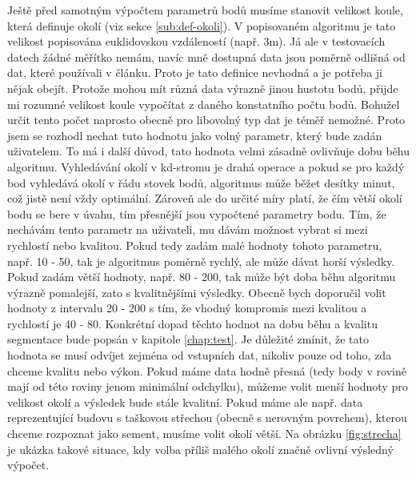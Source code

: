 \documentclass[11pt,twoside,a4paper]{book}
\begin{document}
Ještě před samotným výpočtem parametrů bodů musíme stanovit velikost koule, která definuje okolí (viz sekce \ref{sub:def-okoli}). V popisovaném algoritmu je tato velikost popisována euklidovskou vzdáleností (např. 3m). Já ale v testovacích datech žádné měřítko nemám, navíc mně dostupná data jsou poměrně odlišná od dat, které používali v článku. Proto je tato definice nevhodná a je potřeba ji nějak obejít. Protože mohou mít různá data výrazně jinou hustotu bodů, přijde mi rozumné velikost koule vypočítat z daného konstatního počtu bodů. Bohužel určit tento počet naprosto obecně pro libovolný typ dat je téměř nemožné. Proto jsem se rozhodl nechat tuto hodnotu jako volný parametr, který bude zadán uživatelem. To má i další důvod, tato hodnota velmi zásadně ovlivňuje dobu běhu algoritmu. Vyhledávání okolí v kd-stromu je drahá operace a pokud se pro každý bod vyhledává okolí v řádu stovek bodů, algoritmus může běžet desítky minut, což jistě není vždy optimální. Zároveň ale do určité míry platí, že čím větší okolí bodu se bere v úvahu, tím přesnější jsou vypočtené parametry bodu. Tím, že nechávám tento parametr na uživateli, mu dávám možnost vybrat si mezi rychlostí nebo kvalitou. Pokud tedy zadám malé hodnoty tohoto parametru, např. 10 - 50, tak je algoritmus poměrně rychlý, ale může dávat horší výsledky. Pokud zadám větší hodnoty, např. 80 - 200, tak může být doba běhu algoritmu výrazně pomalejší, zato s kvalitnějšími výsledky. Obecně bych doporučil volit hodnoty z intervalu 20 - 200 s tím, že vhodný kompromis mezi kvalitou a rychlostí je 40 - 80. Konkrétní dopad těchto hodnot na dobu běhu a kvalitu segmentace bude popsán v kapitole \ref{chap:test}. Je důležité zmínit, že tato hodnota se musí odvíjet zejména od vstupních dat, nikoliv pouze od toho, zda chceme kvalitu nebo výkon. Pokud máme data hodně přesná (tedy body v rovině mají od této roviny jenom minimální odchylku), můžeme volit menší hodnoty pro velikost okolí a výsledek bude stále kvalitní. Pokud máme ale např. data reprezentující budovu s taškovou střechou (obecně s nerovným povrchem), kterou chceme rozpoznat jako sement, musíme volit okolí větší. Na obrázku \ref{fig:strecha} je ukázka takové situace, kdy volba příliš malého okolí značně ovlivní výsledný výpočet.
\end{document}
